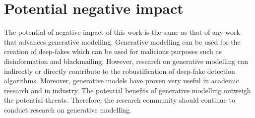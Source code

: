 \section{Potential negative impact}
The potential of negative impact of this work is the same as that of any work that advances generative modelling. Generative modelling can be used for the creation of deep-fakes which can be used for malicious purposes such as disinformation and blackmailing. However, research on generative modelling can indirectly or directly contribute to the robustification of deep-fake detection algorithms. Moreover, generative models have proven very useful in academic research and in industry. The potential benefits of generative modelling outweigh the potential threats. Therefore, the research community should continue to conduct research on generative modelling.